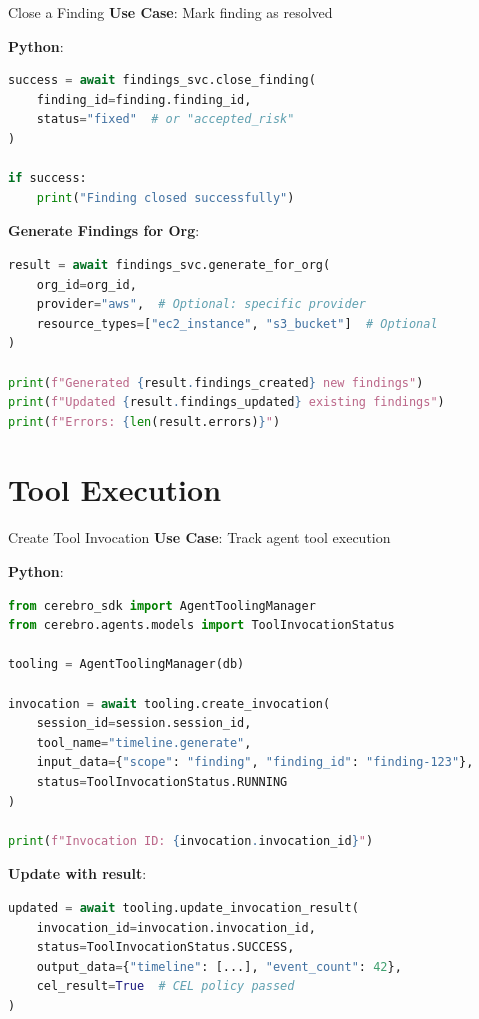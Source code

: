 \documentclass[aspectratio=169]{beamer}
\begin{document}
\begin{frame}[fragile]{Close a Finding}
\textbf{Use Case}: Mark finding as resolved

\textbf{Python}:
\begin{lstlisting}[language=Python]
success = await findings_svc.close_finding(
    finding_id=finding.finding_id,
    status="fixed"  # or "accepted_risk"
)

if success:
    print("Finding closed successfully")
\end{lstlisting}

\textbf{Generate Findings for Org}:
\begin{lstlisting}[language=Python]
result = await findings_svc.generate_for_org(
    org_id=org_id,
    provider="aws",  # Optional: specific provider
    resource_types=["ec2_instance", "s3_bucket"]  # Optional
)

print(f"Generated {result.findings_created} new findings")
print(f"Updated {result.findings_updated} existing findings")
print(f"Errors: {len(result.errors)}")
\end{lstlisting}
\end{frame}

\section{Tool Execution}

\begin{frame}[fragile]{Create Tool Invocation}
\textbf{Use Case}: Track agent tool execution

\textbf{Python}:
\begin{lstlisting}[language=Python]
from cerebro_sdk import AgentToolingManager
from cerebro.agents.models import ToolInvocationStatus

tooling = AgentToolingManager(db)

invocation = await tooling.create_invocation(
    session_id=session.session_id,
    tool_name="timeline.generate",
    input_data={"scope": "finding", "finding_id": "finding-123"},
    status=ToolInvocationStatus.RUNNING
)

print(f"Invocation ID: {invocation.invocation_id}")
\end{lstlisting}

\textbf{Update with result}:
\begin{lstlisting}[language=Python]
updated = await tooling.update_invocation_result(
    invocation_id=invocation.invocation_id,
    status=ToolInvocationStatus.SUCCESS,
    output_data={"timeline": [...], "event_count": 42},
    cel_result=True  # CEL policy passed
)
\end{lstlisting}
\end{frame}
\end{document}
